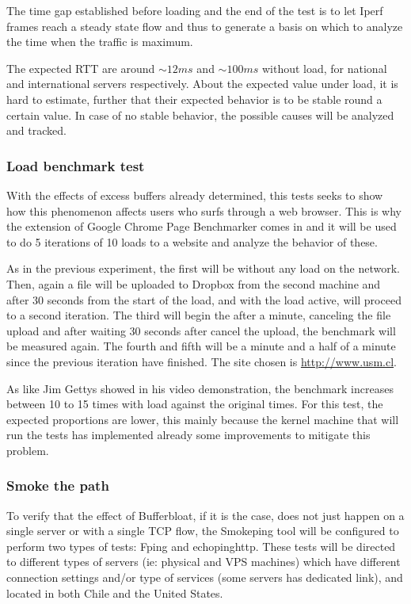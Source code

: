 The time gap established before loading and the end of the test is to let
Iperf frames reach a steady state flow and thus to generate a basis on which
to analyze the time when the traffic is maximum.

The expected RTT are around $\sim12ms$ and $\sim100ms$ without load, for
national and international servers respectively. About the expected value under
load, it is hard to estimate, further that their expected behavior is 
to be stable round a certain value. In case of no stable behavior, the possible 
causes will be analyzed and tracked.

\subsubsection{Load benchmark test}
With the effects of excess buffers already determined, this tests seeks to show
how this phenomenon affects users who surfs through a web browser. This is why
the extension of Google Chrome Page Benchmarker comes in and it will be used to
do 5 iterations of 10 loads to a website and analyze the behavior of these. 

As in the previous experiment, the first will be without any load on the
network. Then, again a file will be uploaded to Dropbox from the second machine
and after 30 seconds from the start of the load, and with the load active, will
proceed to a second iteration. The third will begin the after a minute,
canceling the file upload and after waiting 30 seconds after cancel the upload,
the benchmark will be measured again. The fourth and fifth will be a minute and
a half of a minute since the previous iteration have finished. The site chosen is
\url{http://www.usm.cl}.

As like Jim Gettys showed in his video demonstration\cite{gettysex}, the 
benchmark increases between 10 to 15 times with load against the original times. 
For this test, the expected proportions are lower, this mainly because the 
kernel machine that will run the tests has implemented already some improvements 
to mitigate this problem.

\subsubsection{Smoke the path}
To verify that the effect of Bufferbloat, if it is the case, does not just
happen on a single server or with a single TCP flow, the Smokeping tool will be
configured to perform two types of tests: Fping and echopinghttp. These tests
will be directed to different types of servers (ie: physical and VPS machines)
which have different connection settings and/or type of services (some servers
has dedicated link), and located in both Chile and the United States.

